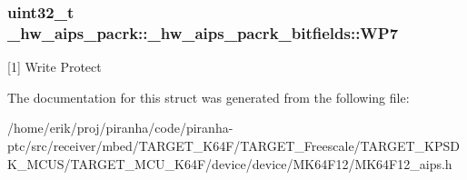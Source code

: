 \subsubsection[{\texorpdfstring{W\+P7}{WP7}}]{\setlength{\rightskip}{0pt plus 5cm}uint32\+\_\+t \+\_\+hw\+\_\+aips\+\_\+pacrk\+::\+\_\+hw\+\_\+aips\+\_\+pacrk\+\_\+bitfields\+::\+W\+P7}\hypertarget{struct__hw__aips__pacrk_1_1__hw__aips__pacrk__bitfields_a697bf9e23b5ce649ca0402598f107688}{}\label{struct__hw__aips__pacrk_1_1__hw__aips__pacrk__bitfields_a697bf9e23b5ce649ca0402598f107688}
\mbox{[}1\mbox{]} Write Protect 

The documentation for this struct was generated from the following file\+:\begin{DoxyCompactItemize}
\item 
/home/erik/proj/piranha/code/piranha-\/ptc/src/receiver/mbed/\+T\+A\+R\+G\+E\+T\+\_\+\+K64\+F/\+T\+A\+R\+G\+E\+T\+\_\+\+Freescale/\+T\+A\+R\+G\+E\+T\+\_\+\+K\+P\+S\+D\+K\+\_\+\+M\+C\+U\+S/\+T\+A\+R\+G\+E\+T\+\_\+\+M\+C\+U\+\_\+\+K64\+F/device/device/\+M\+K64\+F12/M\+K64\+F12\+\_\+aips.\+h\end{DoxyCompactItemize}
